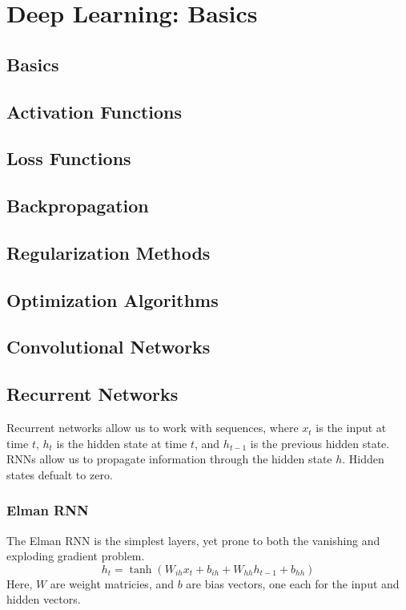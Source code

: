 \section{Deep Learning: Basics}
\subsection{Basics}
\subsection{Activation Functions}
\subsection{Loss Functions}
\subsection{Backpropagation}
\subsection{Regularization Methods}
\subsection{Optimization Algorithms}
\subsection{Convolutional Networks}
\subsection{Recurrent Networks}
Recurrent networks allow us to work with sequences, where $x_t$ is the input
at time $t$, $h_t$ is the hidden state at time $t$, and $h_{t-1}$ is the
previous hidden state. RNNs allow us to propagate information through the
hidden state $h$. Hidden states defualt to zero.
\subsubsection{Elman RNN}
The Elman RNN is the simplest layers, yet prone to both the vanishing and
exploding gradient problem.
\begin{equation}
  h_t = \tanh \left( W_{ih} x_t + b_{ih} + W_{hh} h_{t-1} + b_{hh} \right)
\end{equation}
Here, $W$ are weight matricies, and $b$ are bias vectors, one each for the
input and hidden vectors.
